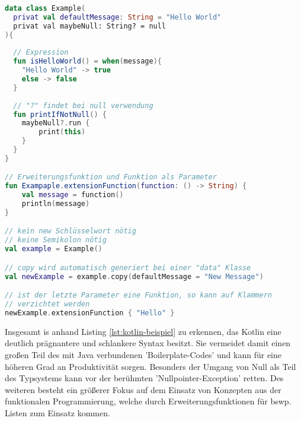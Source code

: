 \begin{lstlisting}[caption={Kotlin Beispiel}, label={lst:kotlin-beispiel}, language=Kotlin]
data class Example(
  privat val defaultMessage: String = "Hello World"
  privat val maybeNull: String? = null
){
  
  // Expression
  fun isHelloWorld() = when(message){
    "Hello World" -> true
    else -> false
  }
  
  // "?" findet bei null verwendung
  fun printIfNotNull() {
    maybeNull?.run { 
    	print(this)
    }
  }
}

// Erweiterungsfunktion und Funktion als Parameter
fun Exampaple.extensionFunction(function: () -> String) { 
	val message = function()
	println(message)
}

// kein new Schlüsselwort nötig
// keine Semikolon nötig
val example = Example()

// copy wird automatisch generiert bei einer "data" Klasse
val newExample = example.copy(defaultMessage = "New Message")

// ist der letzte Parameter eine Funktion, so kann auf Klammern 
// verzichtet werden
newExample.extensionFunction { "Hello" }
\end{lstlisting}
\bigskip
Insgesamt is anhand Listing
\ref{lst:kotlin-beispiel}
zu erkennen, das Kotlin eine deutlich prägnantere und schlankere Syntax besitzt. Sie vermeidet damit einen großen Teil des mit Java verbundenen 'Boilerplate-Codes' und kann für eine höheren Grad an Produktivität sorgen. Besonders der Umgang von Null als Teil des Typsystems kann vor der berühmten 'Nullpointer-Exception' retten. Des weiteren besteht ein größerer Fokus auf dem Einsatz von Konzepten aus der funktionalen Programmierung, welche durch Erweiterungsfunktionen für bswp. Listen zum Einsatz kommen.


